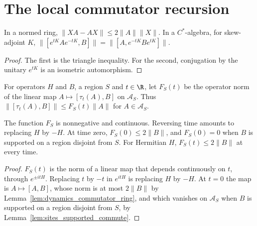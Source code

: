 \section{The local commutator recursion}
\label{sec:dynamics_recursion}

\begin{lemma}
    \label{lem:dynamics_commutator_ring}
    \leanok
    In a normed ring, $\lVert XA-AX\rVert\leq2\lVert A\rVert\lVert X\rVert$. In a
    $C^*$-algebra, for skew-adjoint $K$,
    $\lVert[e^{tK}Ae^{-tK},B]\rVert=\lVert[A,e^{-tK}Be^{tK}]\rVert$.
\end{lemma}
\begin{proof}\leanok
    The first is the triangle inequality. For the second, conjugation by the
    unitary $e^{tK}$ is an isometric automorphism.
\end{proof}

\begin{definition}
    \label{def:dynamics_commutator_norm}
    \leanok
    For operators $H$ and $B$, a region $S$ and $t\in\R$, let $F_S(t)$ be the
    operator norm of the linear map $A\mapsto[\tau_t(A),B]$ on $\mathcal A_S$.
    Thus $\lVert[\tau_t(A),B]\rVert\leq F_S(t)\lVert A\rVert$ for
    $A\in\mathcal A_S$.
\end{definition}

\begin{lemma}
    \label{lem:dynamics_commutator_norm}
    \leanok
    The function $F_S$ is nonnegative and continuous. Reversing time amounts to
    replacing $H$ by $-H$. At time zero, $F_S(0)\leq2\lVert B\rVert$, and
    $F_S(0)=0$ when $B$ is supported on a region disjoint from $S$. For
    Hermitian $H$, $F_S(t)\leq2\lVert B\rVert$ at every time.
\end{lemma}
\begin{proof}\leanok
    $F_S(t)$ is the norm of a linear map that depends continuously on $t$,
    through $e^{\pm itH}$. Replacing $t$ by $-t$ in $e^{itH}$ is replacing $H$
    by $-H$. At $t=0$ the map is $A\mapsto[A,B]$, whose norm is at most
    $2\lVert B\rVert$ by Lemma~\ref{lem:dynamics_commutator_ring}, and which
    vanishes on $\mathcal A_S$ when $B$ is supported on a region disjoint from
    $S$, by Lemma~\ref{lem:sites_supported_commute}.
\end{proof}

